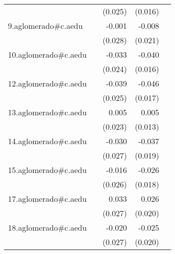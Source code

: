 {\begin{longtable}{l*{4}{D{.}{.}{-1}}}
            &                     &     (0.025)         &     (0.016)         &                     \\
\addlinespace
9.aglomerado#c.aedu&                     &      -0.001         &      -0.008         &                     \\
            &                     &     (0.028)         &     (0.021)         &                     \\
\addlinespace
10.aglomerado#c.aedu&                     &      -0.033         &      -0.040\sym{*}  &                     \\
            &                     &     (0.024)         &     (0.016)         &                     \\
\addlinespace
12.aglomerado#c.aedu&                     &      -0.039         &      -0.046\sym{**} &                     \\
            &                     &     (0.025)         &     (0.017)         &                     \\
\addlinespace
13.aglomerado#c.aedu&                     &       0.005         &       0.005         &                     \\
            &                     &     (0.023)         &     (0.013)         &                     \\
\addlinespace
14.aglomerado#c.aedu&                     &      -0.030         &      -0.037         &                     \\
            &                     &     (0.027)         &     (0.019)         &                     \\
\addlinespace
15.aglomerado#c.aedu&                     &      -0.016         &      -0.026         &                     \\
            &                     &     (0.026)         &     (0.018)         &                     \\
\addlinespace
17.aglomerado#c.aedu&                     &       0.033         &       0.026         &                     \\
            &                     &     (0.027)         &     (0.020)         &                     \\
\addlinespace
18.aglomerado#c.aedu&                     &      -0.020         &      -0.025         &                     \\
            &                     &     (0.027)         &     (0.020)         &                     \\

\end{longtable}}
